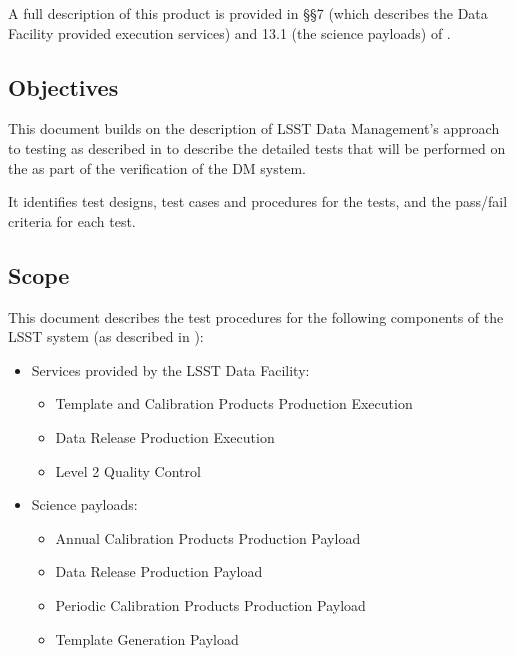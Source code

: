 \documentclass[DM,obsolete,STS,toc]{lsstdoc}
\begin{document}
A full description of this product is provided in \S\S7 (which describes the
Data Facility provided execution services) and 13.1 (the science payloads) of
.

\subsection{Objectives}
\label{sec:objectives}

This document builds on the description of LSST Data Management's approach to
testing as described in  to describe the detailed tests that
will be performed on the \product{} as part of the verification of the DM system.

It identifies test designs, test cases and procedures for the tests, and the
pass/fail criteria for each test.

\subsection{Scope}
\label{sec:scope}

This document describes the test procedures for the following components of
the LSST system (as described in ):

\begin{itemize}

  \item{Services provided by the LSST Data Facility:

    \begin{itemize}
      \item{Template and Calibration Products Production Execution}
      \item{Data Release Production Execution}
      \item{Level 2 Quality Control}
    \end{itemize}
  }

  \item{Science payloads:

    \begin{itemize}
      \item{Annual Calibration Products Production Payload}
      \item{Data Release Production Payload}
      \item{Periodic Calibration Products Production Payload}
      \item{Template Generation Payload}
    \end{itemize}

  }

\end{itemize}
\end{document}
